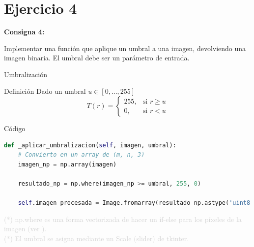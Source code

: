 \documentclass{beamer}
\begin{document}
\section{Ejercicio 4}

\begin{frame}
	\begin{center}
		\textcolor{unahurverde}{\textbf{Consigna 4:}}
	\end{center}
	\justifying
	
	Implementar una función que aplique un umbral a una imagen, devolviendo una imagen binaria. El umbral debe ser un parámetro de entrada.
\end{frame}

\begin{frame}[fragile]{Umbralización}
	\justifying
	
	\begin{block}{Definición}
		Dado un umbral $u \in [0,...,255]$
		\[
		T(r) =
		\begin{cases}
			255, & \text{si } r \geq u \\
			0, & \text{si } r < u
		\end{cases}
		\]
	\end{block}
\end{frame}

\begin{frame}[fragile]{Código}
	\justifying
	
	\begin{lstlisting}[language=Python]
def _aplicar_umbralizacion(self, imagen, umbral):
	# Convierto en un array de (m, n, 3)
	imagen_np = np.array(imagen)
	
	resultado_np = np.where(imagen_np >= umbral, 255, 0)
	
	self.imagen_procesada = Image.fromarray(resultado_np.astype('uint8'))
	\end{lstlisting}
	
	\vfill
	\footnotesize \textcolor{lightgray}{(*) np.where es una forma vectorizada de hacer un if-else para los píxeles de la imagen (ver \cite{numpy-where}).}\\
	\footnotesize \textcolor{lightgray}{(*) El umbral se asigna mediante un Scale (slider) de tkinter.}
\end{frame}
\end{document}
